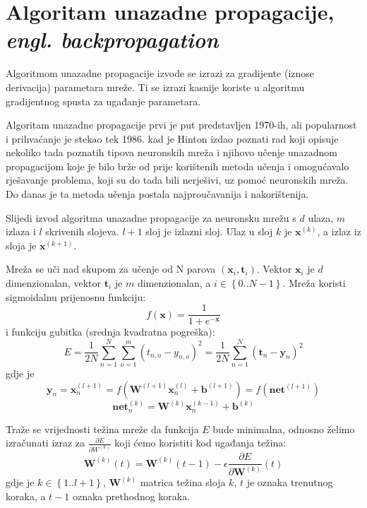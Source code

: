 \documentclass[times, utf8, diplomski, numeric]{fer}
\begin{document}
\section{Algoritam unazadne propagacije, \emph{engl. backpropagation}}

Algoritmom unazadne propagacije izvode se izrazi za gradijente (iznose derivacija) parametara mreže. Ti se izrazi kasnije koriste u algoritmu gradijentnog spusta za ugađanje parametara.

Algoritam unazadne propagacije prvi je put predstavljen 1970-ih, ali popularnost i prihvaćanje je stekao tek 1986. kad je Hinton izdao poznati rad koji opisuje nekoliko tada poznatih tipova neuronskih mreža i njihovo učenje unazadnom propagacijom koje je bilo brže od prije korištenih metoda učenja i omogućavalo rješavanje problema, koji su do tada bili nerješivi, uz pomoć neuronskih mreža. Do danas je ta metoda učenja postala najproučavanija i nakorištenija.

Slijedi izvod algoritma unazadne propagacije za neuronsku mrežu s $d$ ulaza, $m$ izlaza i $l$ skrivenih slojeva. $l+1$ sloj je izlazni sloj.
Ulaz u sloj $k$ je $\boldsymbol{x}^{(k)}$, a izlaz iz sloja je $\boldsymbol{x}^{(k+1)}$.

Mreža se uči nad skupom za učenje od N parova $(\boldsymbol{x}_i, \boldsymbol{t}_i)$. Vektor $\boldsymbol{x}_i$ je $d$ dimenzionalan, vektor $\boldsymbol{t}_i$ je $m$ dimenzionalan, a $i \in \left\{ 0..N-1 \right\}$. Mreža koristi sigmoidalnu prijenosnu funkciju:
\begin{equation}
  f(\boldsymbol{x}) = \frac{1}{1 + e^{-\boldsymbol{x}}}
\end{equation}
i funkciju gubitka (srednja kvadratna pogreška):
\begin{equation}
  E = \frac{1}{2N} \sum_{n=1}^{N} \sum_{o=1}^{m} \left( t_{n,o} - y_{n,o} \right)^2
    = \frac{1}{2N} \sum_{n=1}^{N} \left( \boldsymbol{t}_{n} - \boldsymbol{y}_{n} \right)^2
\end{equation}
gdje je
\begin{equation} %
	\boldsymbol{y}_n = \boldsymbol{x}_n^{(l+1)} = f(\boldsymbol{W}^{(l+1)} \boldsymbol{x}_n^{(l)} + \boldsymbol{b}^{(l+1)}) = f(\boldsymbol{net}^{(l+1)})
\end{equation}
\begin{equation} %
    \boldsymbol{net}^{(k)}_n = \boldsymbol{W}^{(k)} \boldsymbol{x}_n^{(k-1)} + \boldsymbol{b}^{(k)}
\end{equation}

Traže se vrijednosti težina mreže da funkcija $E$ bude minimalna, odnosno želimo izračunati izraz za $\frac{\partial E}{\partial W^{(k)}}$ koji ćemo koristiti kod ugađanja težina:
\begin{equation}
\boldsymbol{W}^{(k)}(t) = \boldsymbol{W}^{(k)}(t-1) - \epsilon \frac{\partial E}{\partial \boldsymbol{W}^{(k)}}(t)
\end{equation}
gdje je $k \in \left\{ 1..l+1 \right\}$, $\boldsymbol{W}^{(k)}$ matrica težina sloja $k$, $t$ je oznaka trenutnog koraka, a $t-1$ oznaka prethodnog koraka.
\end{document}
